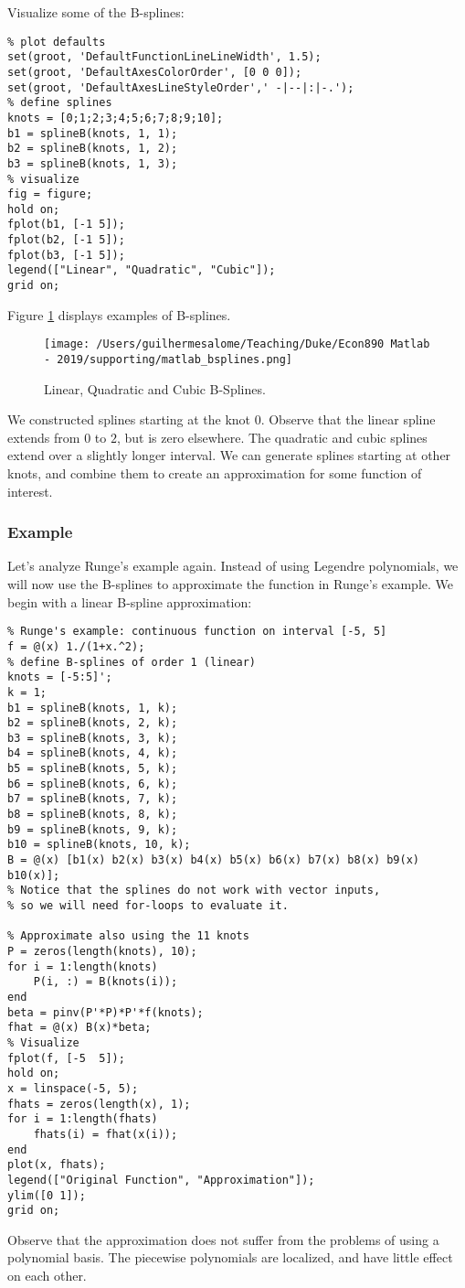 \documentclass[12pt, a4paper]{article}
\begin{document}
Visualize some of the B-splines:
\lstset{language=matlab,label= ,caption= ,captionpos=b,firstnumber=1,numbers=left,style=Matlab-editor}
\begin{lstlisting}
% plot defaults
set(groot, 'DefaultFunctionLineLineWidth', 1.5);
set(groot, 'DefaultAxesColorOrder', [0 0 0]);
set(groot, 'DefaultAxesLineStyleOrder',' -|--|:|-.');
% define splines
knots = [0;1;2;3;4;5;6;7;8;9;10];
b1 = splineB(knots, 1, 1);
b2 = splineB(knots, 1, 2);
b3 = splineB(knots, 1, 3);
% visualize
fig = figure;
hold on;
fplot(b1, [-1 5]);
fplot(b2, [-1 5]);
fplot(b3, [-1 5]);
legend(["Linear", "Quadratic", "Cubic"]);
grid on;
\end{lstlisting}

Figure \ref{fig:org9c70a67} displays examples of B-splines.
\begin{figure}[H]
\centering
\texttt{[image: /Users/guilhermesalome/Teaching/Duke/Econ890 Matlab - 2019/supporting/matlab\_bsplines.png]}
\caption{\label{fig:org9c70a67}
Linear, Quadratic and Cubic B-Splines.}
\end{figure}
We constructed splines starting at the knot \(0\).
Observe that the linear spline extends from \(0\) to \(2\), but is zero elsewhere.
The quadratic and cubic splines extend over a slightly longer interval.
We can generate splines starting at other knots, and combine them to create an approximation for some function of interest.
\subsubsection{Example}
\label{sec:orgbcfaa8f}
Let's analyze Runge's example again.
Instead of using Legendre polynomials, we will now use the B-splines to approximate the function in Runge's example.
We begin with a linear B-spline approximation:
\lstset{language=matlab,label= ,caption= ,captionpos=b,firstnumber=1,numbers=left,style=Matlab-editor}
\begin{lstlisting}
% Runge's example: continuous function on interval [-5, 5]
f = @(x) 1./(1+x.^2);
% define B-splines of order 1 (linear)
knots = [-5:5]';
k = 1;
b1 = splineB(knots, 1, k);
b2 = splineB(knots, 2, k);
b3 = splineB(knots, 3, k);
b4 = splineB(knots, 4, k);
b5 = splineB(knots, 5, k);
b6 = splineB(knots, 6, k);
b7 = splineB(knots, 7, k);
b8 = splineB(knots, 8, k);
b9 = splineB(knots, 9, k);
b10 = splineB(knots, 10, k);
B = @(x) [b1(x) b2(x) b3(x) b4(x) b5(x) b6(x) b7(x) b8(x) b9(x) b10(x)];
% Notice that the splines do not work with vector inputs,
% so we will need for-loops to evaluate it.

% Approximate also using the 11 knots
P = zeros(length(knots), 10);
for i = 1:length(knots)
    P(i, :) = B(knots(i));
end
beta = pinv(P'*P)*P'*f(knots);
fhat = @(x) B(x)*beta;
% Visualize
fplot(f, [-5  5]);
hold on;
x = linspace(-5, 5);
fhats = zeros(length(x), 1);
for i = 1:length(fhats)
    fhats(i) = fhat(x(i));
end
plot(x, fhats);
legend(["Original Function", "Approximation"]);
ylim([0 1]);
grid on;
\end{lstlisting}
Observe that the approximation does not suffer from the problems of using a polynomial basis.
The piecewise polynomials are localized, and have little effect on each other.
\end{document}
